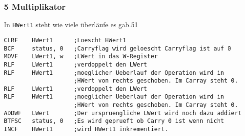 \subsubsection*{5 Multiplikator}
In \texttt{HWert1} steht wie viele überläufe es gab.51
\begin{lstlisting}[language=avr]
CLRF    HWert1      ;Loescht HWert1
BCF     status, 0   ;Carryflag wird geloescht Carryflag ist auf 0
MOVF    LWert1, w   ;LWert in das W-Register
RLF     LWert1      ;verdoppelt den LWert
RLF     HWert1      ;moeglicher Ueberlauf der Operation wird in 
                    ;HWert von rechts geschoben. Im Carray steht 0.
RLF     LWert1      ;verdoppelt den LWert
RLF     HWert1      ;moeglicher Ueberlauf der Operation wird in 
                    ;HWert von rechts geschoben. Im Carray steht 0.
ADDWF   LWert       ;Der urspruengliche LWert wird noch dazu addiert
BTFSC   status, 0   ;Es wird geprueft ob Carry 0 ist wenn nicht 
INCF    HWert1      ;wird HWert1 inkrementiert.
\end{lstlisting}

